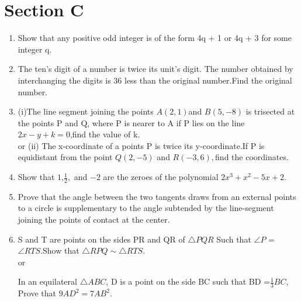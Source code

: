 \documentclass[journal,12pt,twocolumn]{IEEEtran}
\renewcommand\thesection{\arabic{section}}
\begin{document}
\section{Section C}
\renewcommand{\theequation}{\theenumi}
\begin{enumerate}[label=\thesection.\arabic*.,ref=\thesection.\theenumi]
\item Show that any positive odd integer is of the form 4q + 1 or 4q + 3 for some integer q.\\

\item The ten's digit of a number is twice its unit's digit. The number obtained by interchanging the digits is 36 less than the original number.Find the original number.\\

\item (i)The line segment joining the points $A(2,1)$and $B(5,-8)$ is trisected at the points P and Q, where P is nearer to A if P lies on the line $2x-y+k=0$,find the value of k.\\or
\newline (ii) The x-coordinate of a points P is twice its y-coordinate.If P is equidistant from the point $Q(2,-5)$ and $R(-3,6),$find the coordinates.\\

\item Show that $1$,$\frac{1}{2},$ and $-2$ are the zeroes of the polynomial $2x^3+x^2-5x+2.$\\

\item Prove that the angle between the two tangents draws from an external points to a circle is supplementary to the angle subtended by the line-segment joining the points of contact at the center.\\

\item S and T are points on the sides PR and QR of $\triangle PQR $ Such that  $\angle P $ = $\angle RTS$.Show that $\triangle RPQ \sim \triangle RTS$.\\ or

In an equilateral $\triangle ABC$, D is a point on the side BC such that BD =$\frac{1}{3}BC$, Prove that $9AD^2 =7AB^2.$\\


\end{enumerate}
\end{document}
